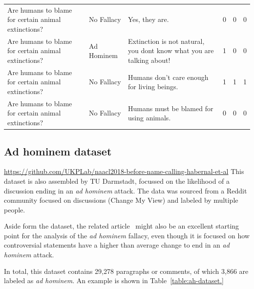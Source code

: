 \documentclass[a4paper]{article}
\begin{document}
\begin{table}
\begin{tabularx}{\textwidth}{@{}LlLlll@{}}
    Are humans to blame for certain animal extinctions? & No Fallacy                    & Yes, they are.                                                                                                                           & 0    & 0      & 0      \\
    Are humans to blame for certain animal extinctions? & Ad Hominem                    & Extinction is not natural, you dont know what you are talking about!                                                                     & 1    & 0      & 0      \\
    Are humans to blame for certain animal extinctions? & No Fallacy                    & Humans don't care enough for living beings.                                                                                              & 1    & 1      & 1      \\
    Are humans to blame for certain animal extinctions? & No Fallacy                    & Humans must be blamed for using animals.                                                                                                 & 0    & 0      & 0      \\ \hline
    \end{tabularx}
\end{table}

\subsection{Ad hominem dataset~\cite{Habernal.et.al.2018.NAACL.adhominem}}
\url{https://github.com/UKPLab/naacl2018-before-name-calling-habernal-et-al}
This dataset is also assembled by TU Darmstadt, focussed on the likelihood of a discussion ending in an \emph{ad hominem} attack. The data was sourced from a Reddit community focused on discussions (Change My View) and labeled by multiple people.  

Aside form the dataset, the related article~\cite{Habernal.et.al.2018.NAACL.adhominem} might also be an excellent starting point for the analysis of the \emph{ad hominem} fallacy, even though it is focused on how controversial statements have a higher than average change to end in an \emph{ad hominem} attack.

In total, this dataset contains 29,278 paragraphs or comments, of which 3,866 are labeled as \emph{ad hominem}. An example is shown in Table~\ref{table:ah-dataset.}
\end{document}
